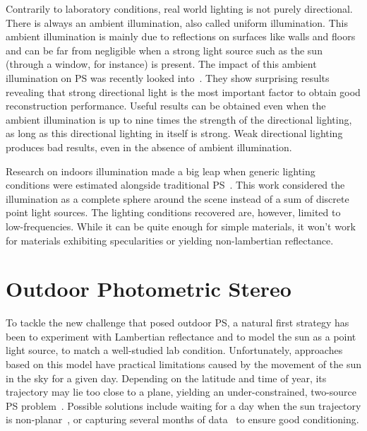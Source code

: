\documentclass{report}
\begin{document}
Contrarily to laboratory conditions, real world lighting is not purely directional. There is always an ambient illumination, also called uniform illumination. This ambient illumination is mainly due to reflections on surfaces like walls and floors and can be far from negligible when a strong light source such as the sun (through a window, for instance) is present. The impact of this ambient illumination on PS was recently looked into~\cite{Angelopoulou2013}. They show surprising results revealing that strong directional light is the most important factor to obtain good reconstruction performance. Useful results can be obtained even when the ambient illumination is up to nine times the strength of the directional lighting, as long as this directional lighting in itself is strong. Weak directional lighting produces bad results, even in the absence of ambient illumination.

Research on indoors illumination made a big leap when generic lighting conditions were estimated alongside traditional PS~\cite{basri-ijcv-2007}. This work considered the illumination as a complete sphere around the scene instead of a sum of discrete point light sources. The lighting conditions recovered are, however, limited to low-frequencies. While it can be quite enough for simple materials, it won't work for materials exhibiting specularities or yielding non-lambertian reflectance.



\section{Outdoor Photometric Stereo}

To tackle the new challenge that posed outdoor PS, a natural first strategy has been to experiment with Lambertian reflectance and to model the sun as a point light source, to match a well-studied lab condition. Unfortunately, approaches based on this model have practical limitations caused by the movement of the sun in the sky for a given day. Depending on the latitude and time of year, its trajectory may lie too close to a plane, yielding an under-constrained, two-source PS problem~\cite{hernandez-pami-11}. Possible solutions include waiting for a day when the sun trajectory is non-planar~\cite{shen-pg-14}, or capturing several months of data~\cite{ackermann-cvpr-12,abrams-eccv-12} to ensure good conditioning.
\end{document}
